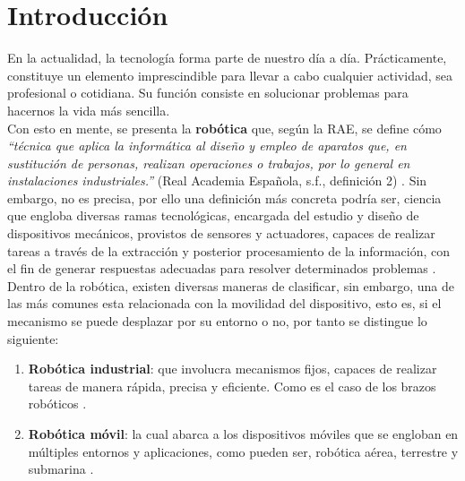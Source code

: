 \chapter{Introducción}
\label{cap:capitulo1}
\setcounter{page}{1}

En la actualidad, la tecnología forma parte de nuestro día a día. Prácticamente, constituye un elemento imprescindible para llevar a cabo cualquier actividad, sea profesional o cotidiana. Su función consiste en solucionar problemas para hacernos la vida más sencilla.\\

Con esto en mente, se presenta la \textbf{robótica} que, según la \ac{RAE}, se define cómo \emph{``técnica que aplica la informática al diseño y empleo de aparatos que, en sustitución de personas, realizan operaciones o trabajos, por lo general en instalaciones industriales.''} (Real Academia Española, s.f., definición 2) \cite{rae-robotica}. Sin embargo, no es precisa, por ello una definición más concreta podría ser, ciencia que engloba diversas ramas tecnológicas, encargada del estudio y diseño de dispositivos mecánicos, provistos de sensores y actuadores, capaces de realizar tareas a través de la extracción y posterior procesamiento de la información, con el fin de generar respuestas adecuadas para resolver determinados problemas \cite{revista-de-robots}.\\

Dentro de la robótica, existen diversas maneras de clasificar, sin embargo, una de las más comunes esta relacionada con la movilidad del dispositivo, esto es, si el mecanismo se puede desplazar por su entorno o no, por tanto se distingue lo siguiente:

\begin{enumerate}
	\item \textbf{Robótica industrial}: que involucra mecanismos fijos, capaces de realizar tareas de manera rápida, precisa y eficiente. Como es el caso de los brazos robóticos \cite{industrial-robot}.

	\item \textbf{Robótica móvil}: la cual abarca a los dispositivos móviles que se engloban en múltiples entornos y aplicaciones, como pueden ser, robótica aérea, terrestre y submarina \cite{mobile-robot}.
\end{enumerate}

